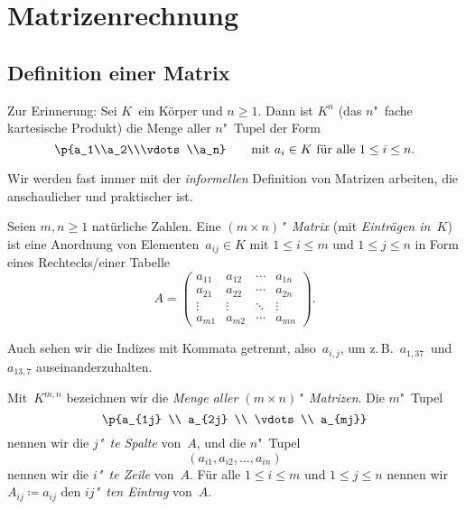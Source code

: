 \documentclass[a4paper]{article}
\begin{document}
\section{Matrizenrechnung}

\subsection{Definition einer Matrix}

Zur Erinnerung: Sei $K$~ein Körper und $n \geq 1$. Dann ist $K^n$ (das $n$"~fache kartesische Produkt) die Menge aller $n$"~Tupel der Form
\begin{equation*}
    \p{a_1\\a_2\\\vdots\\a_n} \qquad\text{mit } a_i \in K \text{ für alle } 1 \leq i \leq n.
\end{equation*}

Wir werden fast immer mit der \emph{informellen} Definition von Matrizen arbeiten, die anschaulicher und praktischer ist.

\begin{definition}
    Seien $m,n \geq 1$ natürliche Zahlen. Eine \emph{$(m\times n)$"~Matrix} (mit \emph{Einträgen in~$K$}) ist eine Anordnung von Elementen~$a_{ij} \in K$ mit $1 \leq i \leq m$ und $1 \leq j \leq n$ in Form eines Rechtecks\slash einer Tabelle
    \begin{equation*}
        A = \begin{pmatrix}
            a_{11} & a_{12} & \cdots & a_{1n} \\
            a_{21} & a_{22} & \cdots & a_{2n} \\
            \vdots & \vdots & \ddots & \vdots \\
            a_{m1} & a_{m2} & \cdots & a_{mn}
        \end{pmatrix}.
    \end{equation*}
\end{definition}

Auch sehen wir die Indizes mit Kommata getrennt, also~$a_{i,j}$, um z.\,B.\ $a_{1, 37}$~und~$a_{13, 7}$ auseinanderzuhalten.

\begin{notation}
    Mit~$K^{m,n}$ bezeichnen wir die \emph{Menge aller $(m\times n)$"~Matrizen}. Die $m$"~Tupel
    \begin{equation*}
        \p{a_{1j} \\ a_{2j} \\ \vdots \\ a_{mj}}
    \end{equation*}
    nennen wir die \emph{$j$"~te Spalte} von~$A$, und die $n$"~Tupel
    \begin{equation*}
        (a_{i1}, a_{i2}, \dots, a_{in})
    \end{equation*}
    nennen wir die \emph{$i$"~te Zeile} von~$A$. Für alle $1 \leq i \leq m$ und $1 \leq j \leq n$ nennen wir $A_{ij} \coloneqq a_{ij}$ den \emph{$ij$"~ten Eintrag} von~$A$.
\end{notation}
\end{document}

